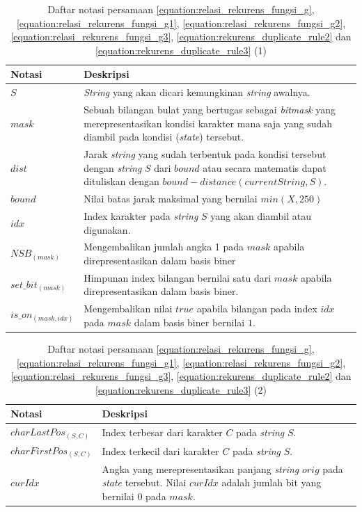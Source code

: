 \begin{table}
	\centering
	\begin{tabular} {|p{3cm}|p{5cm}|} \hline
		Notasi & Deskripsi\\ \hline
		$ S $ & \textit{String} yang akan dicari kemungkinan \textit{string} awalnya.\\ \hline
		$ mask $ & Sebuah bilangan bulat yang bertugas sebagai \textit{bitmask} yang merepresentasikan kondisi karakter mana saja yang sudah diambil pada kondisi (\textit{state}) tersebut.\\ \hline
		$ dist $ & Jarak \textit{string} yang sudah terbentuk pada kondisi tersebut dengan \textit{string} $ S $ dari $ bound $ atau secara matematis dapat dituliskan dengan $ bound - distance(currentString, S) $.\\ \hline
		$ bound $ & Nilai batas jarak maksimal yang bernilai $ min(X, 250) $\\ \hline
		$ idx $ & Index karakter pada \textit{string} $ S $ yang akan diambil atau digunakan.\\ \hline
		$ NSB_{(mask)} $ & Mengembalikan jumlah angka 1 pada $ mask $ apabila direpresentasikan dalam basis biner\\ \hline
		$ set\_bit_{(mask)} $ & Himpunan index bilangan bernilai satu dari $ mask $ apabila direpresentasikan dalam basis biner.\\ \hline
		$ is\_on_{(mask, idx)} $ & Mengembalikan nilai $ true $ apabila bilangan pada index $ idx $ pada $ mask $ dalam basis biner bernilai $ 1 $.\\ \hline
		
	\end{tabular}\caption{Daftar notasi persamaan \ref{equation:relasi_rekurens_fungsi_g}, \ref{equation:relasi_rekurens_fungsi_g1}, \ref{equation:relasi_rekurens_fungsi_g2}, \ref{equation:relasi_rekurens_fungsi_g3}, \ref{equation:rekurens_duplicate_rule2} dan \ref{equation:rekurens_duplicate_rule3} (1)}
	\label{tab:daftar_notasi_g_1}
\end{table}

\begin{table}
	\centering
	\begin{tabular} {|p{3cm}|p{5cm}|} \hline
		Notasi & Deskripsi\\ \hline
		$ charLastPos_{(S, C)} $ & Index terbesar dari karakter $ C $ pada \textit{string} $ S $.\\ \hline
		$ charFirstPos_{(S, C)} $ & Index terkecil dari karakter $ C $ pada \textit{string} $ S $.\\ \hline
		$ curIdx $ & Angka yang merepresentasikan panjang \textit{string} $ orig $ pada \textit{state} tersebut. Nilai $ curIdx $ adalah jumlah bit yang bernilai $ 0 $ pada $ mask $.\\ \hline
		
		
	\end{tabular}\caption{Daftar notasi persamaan \ref{equation:relasi_rekurens_fungsi_g}, \ref{equation:relasi_rekurens_fungsi_g1}, \ref{equation:relasi_rekurens_fungsi_g2}, \ref{equation:relasi_rekurens_fungsi_g3}, \ref{equation:rekurens_duplicate_rule2} dan \ref{equation:rekurens_duplicate_rule3} (2)}
	\label{tab:daftar_notasi_g_2}
\end{table}

